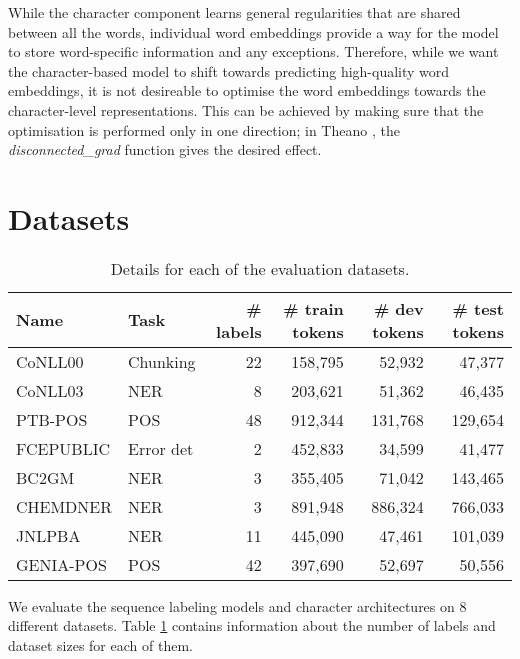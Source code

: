 \documentclass[11pt]{article}
\begin{document}
While the character component learns general regularities that are shared between all the words, individual word embeddings provide a way for the model to store word-specific information and any exceptions.
Therefore, while we want the character-based model to shift towards predicting high-quality word embeddings, it is not desireable to optimise the word embeddings towards the character-level representations. 
This can be achieved by making sure that the optimisation is performed only in one direction; in Theano \cite{Bergstra2010}, the \textit{disconnected\_grad} function gives the desired effect.

\section{Datasets}

\begin{table}
\centering
\begin{tabular}{llrrrr} \toprule
Name     & Task            & \# labels & \# train tokens & \# dev tokens & \# test tokens\\ \midrule
CoNLL00 & Chunking & 22 & 158,795 & 52,932 & 47,377 \\
CoNLL03 & NER & 8 & 203,621 & 51,362 & 46,435 \\
PTB-POS & POS &  48 & 912,344 & 131,768 & 129,654\\
FCEPUBLIC & Error det & 2 & 452,833 & 34,599 & 41,477 \\
BC2GM    & NER     & 3 & 355,405 & 71,042 & 143,465\\
CHEMDNER & NER & 3 & 891,948 & 886,324 & 766,033\\
JNLPBA   & NER & 11 & 445,090 & 47,461 & 101,039\\
GENIA-POS    & POS             & 42 & 397,690 & 52,697 & 50,556\\ \bottomrule
\end{tabular}
\caption{Details for each of the evaluation datasets.}
\label{tbl:datasets}
\end{table}

We evaluate the sequence labeling models and character architectures on 8 different datasets. Table \ref{tbl:datasets} contains information about the number of labels and dataset sizes for each of them.
\end{document}
